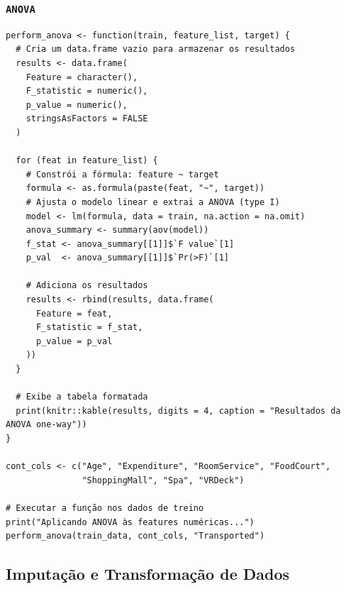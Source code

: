 \documentclass[12pt,a4paper]{article}
\begin{document}
\subsubsection{\texttt{ANOVA}}
\label{sec:org8d8d5b0}
\begin{verbatim}
perform_anova <- function(train, feature_list, target) {
  # Cria um data.frame vazio para armazenar os resultados
  results <- data.frame(
    Feature = character(),
    F_statistic = numeric(),
    p_value = numeric(),
    stringsAsFactors = FALSE
  )

  for (feat in feature_list) {
    # Constrói a fórmula: feature ~ target
    formula <- as.formula(paste(feat, "~", target))
    # Ajusta o modelo linear e extrai a ANOVA (type I)
    model <- lm(formula, data = train, na.action = na.omit)
    anova_summary <- summary(aov(model))
    f_stat <- anova_summary[[1]]$`F value`[1]
    p_val  <- anova_summary[[1]]$`Pr(>F)`[1]

    # Adiciona os resultados
    results <- rbind(results, data.frame(
      Feature = feat,
      F_statistic = f_stat,
      p_value = p_val
    ))
  }

  # Exibe a tabela formatada
  print(knitr::kable(results, digits = 4, caption = "Resultados da ANOVA one-way"))
}

cont_cols <- c("Age", "Expenditure", "RoomService", "FoodCourt", 
               "ShoppingMall", "Spa", "VRDeck")

# Executar a função nos dados de treino
print("Aplicando ANOVA às features numéricas...")
perform_anova(train_data, cont_cols, "Transported")
\end{verbatim}
\subsection{Imputação e Transformação de Dados}
\label{sec:org78e83b9}
\end{document}
